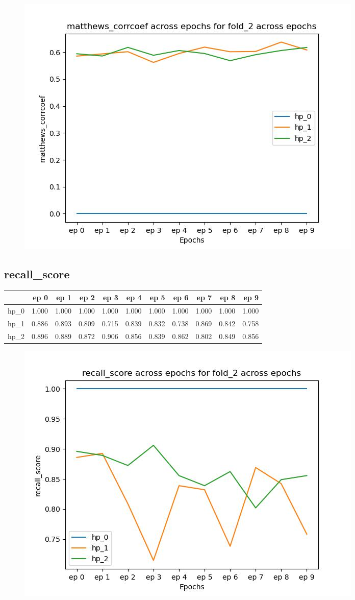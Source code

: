 \documentclass{article}
\begin{document}
\begin{figure}[H]
\includegraphics[scale = 0.75]{fold_2/matthews_corrcoef}
\end{figure}
\subsection{recall\_score}
\begin{tabular}{lrrrrrrrrrr}
\toprule
{} &   ep 0 &   ep 1 &   ep 2 &   ep 3 &   ep 4 &   ep 5 &   ep 6 &   ep 7 &   ep 8 &   ep 9 \\
\midrule
hp\_0 &  1.000 &  1.000 &  1.000 &  1.000 &  1.000 &  1.000 &  1.000 &  1.000 &  1.000 &  1.000 \\
hp\_1 &  0.886 &  0.893 &  0.809 &  0.715 &  0.839 &  0.832 &  0.738 &  0.869 &  0.842 &  0.758 \\
hp\_2 &  0.896 &  0.889 &  0.872 &  0.906 &  0.856 &  0.839 &  0.862 &  0.802 &  0.849 &  0.856 \\
\bottomrule
\end{tabular}

\begin{figure}[H]
\includegraphics[scale = 0.75]{fold_2/recall_score}
\end{figure}
\end{document}
